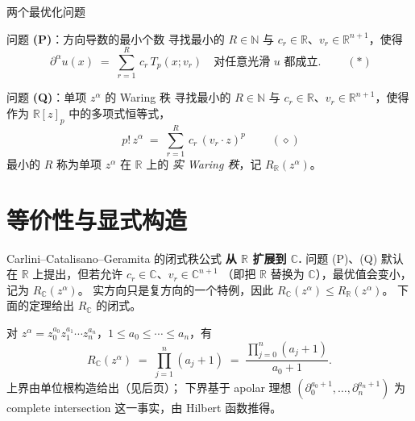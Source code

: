 \documentclass[10pt,aspectratio=169]{beamer}
\newcommand{\R}{\mathbb{R}}
\newcommand{\C}{\mathbb{C}}
\newcommand{\Tp}{T_p}
\newcommand{\dal}{\partial^{\alpha}}
\begin{document}
\begin{frame}{两个最优化问题}
  \begin{block}{问题 \textbf{(P)}：方向导数的最小个数}
  寻找最小的 $R\in\mathbb{N}$ 与 $c_r\in\R$、$v_r\in\R^{n+1}$，使得
  \[
    \boxed{\;\dal u(x)
       \;=\; \sum_{r=1}^{R}\,c_r\,\Tp(x;v_r)
       \quad\text{对任意光滑 }u\text{ 都成立}.\;}
    \qquad (\ast)
  \]
  \end{block}

  \begin{block}{问题 \textbf{(Q)}：单项 $z^\alpha$ 的 Waring 秩}
  寻找最小的 $R\in\mathbb{N}$ 与 $c_r\in\R$、$v_r\in\R^{n+1}$，使得作为 $\R[z]_p$ 中的多项式恒等式，
  \[
    \boxed{\;p!\,z^{\alpha} \;=\; \sum_{r=1}^{R}\,c_r\,(v_r\!\cdot\! z)^{p}\;}
    \qquad (\diamond)
  \]
  最小的 $R$ 称为单项 $z^\alpha$ 在 $\R$ 上的 \emph{实 Waring 秩}，记 $R_\R(z^\alpha)$。
  \end{block}
\end{frame}

\section{等价性与显式构造}

\begin{frame}{Carlini--Catalisano--Geramita 的闭式秩公式}
  \textbf{从 $\R$ 扩展到 $\C$.}\;
  问题 (P)、(Q) 默认在 $\R$ 上提出，但若允许 $c_r\in\C$、$v_r\in\C^{n+1}$
  （即把 $\R$ 替换为 $\C$），最优值会变小，记为 $R_\C(z^\alpha)$。
  实方向只是复方向的一个特例，因此 $R_\C(z^\alpha)\le R_\R(z^\alpha)$。
  下面的定理给出 $R_\C$ 的闭式。

  \medskip
  \begin{theorem}
  对 $z^\alpha = z_0^{a_0}z_1^{a_1}\cdots z_n^{a_n}$，$1\le a_0\le\cdots\le a_n$，有
  \[
    \boxed{\;R_{\C}(z^\alpha) \;=\; \prod_{j=1}^{n}(a_j+1)
                              \;=\; \frac{\prod_{j=0}^{n}(a_j+1)}{a_0+1}.\;}
  \]
  上界由单位根构造给出（见后页）；
  下界基于 apolar 理想 $(\partial_0^{a_0+1},\dots,\partial_n^{a_n+1})$
  为 complete intersection 这一事实，由 Hilbert 函数推得。
  \end{theorem}
\end{frame}
\end{document}
